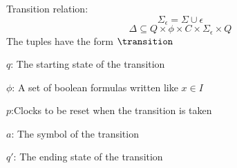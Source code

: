 
\begin{definition}\label{definition:transition}
    Transition relation:
    $$\Sigma_\epsilon=\Sigma\cup{\epsilon}$$
    $$\Delta\subseteq Q\times\phi\times C\times\Sigma_\epsilon\times Q$$
The tuples have the form $\transition$

$q$: The starting state of the transition

$\phi$: A set of boolean formulas written like $x\in I$

$p$:Clocks to be reset when the transition is taken

$a$: The symbol of the transition

$q'$: The ending state of the transition
\end{definition}\cite*{Eugene2001}